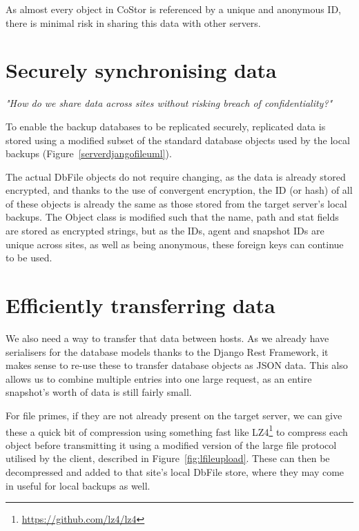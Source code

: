 \documentclass[bsc,frontabs,twoside,singlespacing,parskip,deptreport]{infthesis}     %
\begin{document}
As almost every object in CoStor is referenced by a unique and anonymous ID, there is minimal 
risk in sharing this data with other servers.

\section{Securely synchronising data}


\large \textit{"How do we share data across sites without risking breach of confidentiality?"}
\normalsize

To enable the backup databases to be replicated securely, replicated data is stored using a modified
subset of the standard database objects used by the local backups (Figure~\ref{serverdjangofileuml}).

The actual DbFile objects do not require changing, as the data is already stored encrypted, and thanks
to the use of convergent encryption, the ID (or hash) of all of these objects is already the same as
those stored from the target server's local backups. The Object class is modified such that the name,
path and stat fields are stored as encrypted strings, but as the IDs, agent and snapshot IDs are unique
across sites, as well as being anonymous, these foreign keys can continue to be used.

\section{Efficiently transferring data}

We also need a way to transfer that data between hosts. As we already have serialisers for the 
database models thanks to the Django Rest Framework, it makes sense to re-use these to transfer 
database objects as JSON data. This also allows us to combine multiple entries into one large
request, as an entire snapshot's worth of data is still fairly small.

For file primes, if they are not already present on the target server, we can give these a quick bit
of compression using something fast like LZ4\footnote{\url{https://github.com/lz4/lz4}} to compress
each object before transmitting it using a modified version of the large file protocol utilised by
the client, described in Figure~\ref{fig:lfileupload}. These can then be decompressed and added to that
site's local DbFile store, where they may come in useful for local backups as well.
\end{document}
